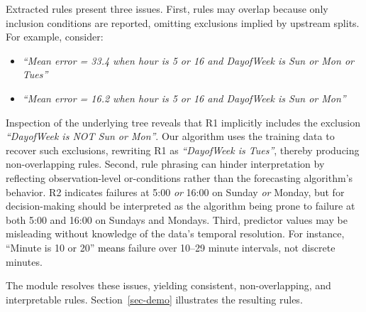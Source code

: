 \documentclass[12pt]{article}
\newcommand{\galit}[1]{\textcolor{black}{#1}}
\begin{document}
Extracted rules present three issues. First, rules may overlap because only inclusion conditions are reported, omitting exclusions implied by upstream splits.
For example, consider:

{
\begin{itemize}
    \setlength{\itemsep}{0pt}
    \setlength{\parskip}{0pt}
    \setlength{\topsep}{2pt}
    \item[(R1)] \textit{``Mean error = 33.4 when hour is 5 or 16 and DayofWeek is Sun or Mon or Tues''}
    \item[(R2)] \textit{``Mean error = 16.2 when hour is 5 or 16 and DayofWeek is Sun or Mon''}
\end{itemize}}
Inspection of the underlying tree reveals that R1 implicitly includes the exclusion \textit{``DayofWeek is NOT Sun or Mon''}. Our algorithm uses the training data to recover such exclusions, rewriting R1 as \textit{``DayofWeek is Tues''}, thereby producing non-overlapping rules. Second, rule phrasing can hinder interpretation by reflecting observation-level or-conditions rather than the forecasting algorithm’s behavior. R2 indicates failures at 5:00 \emph{or} 16:00 on Sunday \emph{or} Monday, but for decision-making should be interpreted as the algorithm being prone to failure at both 5:00 and 16:00 on Sundays and Mondays. Third, predictor values may be misleading without knowledge of the data’s temporal resolution. For instance, “Minute is 10 or 20” \galit{means} %
failure over 10–29 minute intervals, not discrete minutes.

The module resolves these issues, yielding consistent, non-overlapping, and interpretable rules. Section~\ref{sec-demo} illustrates the resulting rules.


\end{document}
